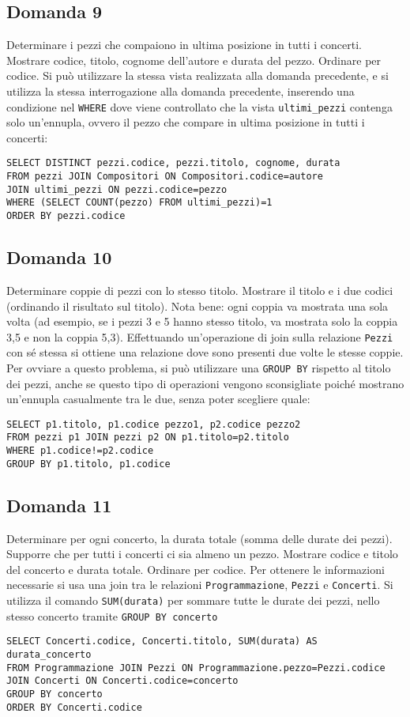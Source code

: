 \documentclass{article}
\numberwithin{equation}{subsection}
\begin{document}
\subsection*{Domanda 9}
Determinare i pezzi che compaiono in ultima posizione in tutti i concerti. Mostrare codice, titolo, cognome dell'autore e durata del pezzo. Ordinare per codice. Si può utilizzare la stessa vista realizzata 
alla domanda precedente, e si utilizza la stessa interrogazione alla domanda precedente, inserendo una condizione nel \verb|WHERE| dove viene controllato che la vista \verb|ultimi_pezzi| contenga solo un'ennupla, 
ovvero il pezzo che compare in ultima posizione in tutti i concerti:
\begin{verbatim}
SELECT DISTINCT pezzi.codice, pezzi.titolo, cognome, durata
FROM pezzi JOIN Compositori ON Compositori.codice=autore
JOIN ultimi_pezzi ON pezzi.codice=pezzo
WHERE (SELECT COUNT(pezzo) FROM ultimi_pezzi)=1
ORDER BY pezzi.codice
\end{verbatim}

\subsection*{Domanda 10}
Determinare coppie di pezzi con lo stesso titolo. Mostrare il titolo e i due codici (ordinando il risultato sul titolo). Nota bene: ogni coppia va mostrata una sola volta 
(ad esempio, se i pezzi 3 e 5 hanno stesso titolo, va mostrata solo la coppia 3,5 e non la coppia 5,3). Effettuando un'operazione di join sulla relazione \verb|Pezzi| con sé stessa si ottiene una relazione dove sono 
presenti due volte le stesse coppie. Per ovviare a questo problema, si può utilizzare una \verb|GROUP BY| rispetto al titolo dei pezzi, anche se questo tipo di operazioni vengono sconsigliate poiché mostrano 
un'ennupla casualmente tra le due, senza poter scegliere quale:
\begin{verbatim}
SELECT p1.titolo, p1.codice pezzo1, p2.codice pezzo2
FROM pezzi p1 JOIN pezzi p2 ON p1.titolo=p2.titolo
WHERE p1.codice!=p2.codice
GROUP BY p1.titolo, p1.codice
\end{verbatim}

\subsection*{Domanda 11}
Determinare per ogni concerto, la durata totale (somma delle durate dei pezzi). Supporre che per tutti i concerti ci sia almeno un pezzo. Mostrare codice e titolo del concerto e durata totale. Ordinare per codice. 
Per ottenere le informazioni necessarie si usa una join tra le relazioni \verb|Programmazione|, \verb|Pezzi| e \verb|Concerti|. Si utilizza il comando \verb|SUM(durata)| per sommare tutte le durate dei pezzi, nello 
stesso concerto tramite \verb|GROUP BY concerto|  
\begin{verbatim}
SELECT Concerti.codice, Concerti.titolo, SUM(durata) AS durata_concerto
FROM Programmazione JOIN Pezzi ON Programmazione.pezzo=Pezzi.codice
JOIN Concerti ON Concerti.codice=concerto
GROUP BY concerto
ORDER BY Concerti.codice
\end{verbatim}
\end{document}
